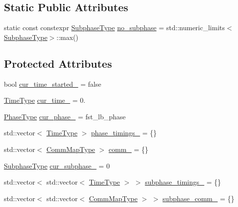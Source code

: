 \subsection*{Static Public Attributes}
\begin{DoxyCompactItemize}
\item 
static const constexpr \hyperlink{namespacevt_ae78cbfdf1e57470e33eedb074f2beeba}{Subphase\+Type} \hyperlink{structvt_1_1vrt_1_1collection_1_1balance_1_1_element_stats_a26682687c88b2c607365b040a9804096}{no\+\_\+subphase} = std\+::numeric\+\_\+limits$<$\hyperlink{namespacevt_ae78cbfdf1e57470e33eedb074f2beeba}{Subphase\+Type}$>$\+::max()
\end{DoxyCompactItemize}
\subsection*{Protected Attributes}
\begin{DoxyCompactItemize}
\item 
bool \hyperlink{structvt_1_1vrt_1_1collection_1_1balance_1_1_element_stats_a4fa029e81c6907ace700b8c3df10457f}{cur\+\_\+time\+\_\+started\+\_\+} = false
\item 
\hyperlink{namespacevt_a876a9d0cd5a952859c72de8a46881442}{Time\+Type} \hyperlink{structvt_1_1vrt_1_1collection_1_1balance_1_1_element_stats_ab0538c11d7a658e43f80c48023f7b8c6}{cur\+\_\+time\+\_\+} = 0.
\item 
\hyperlink{namespacevt_a46ce6733d5cdbd735d561b7b4029f6d7}{Phase\+Type} \hyperlink{structvt_1_1vrt_1_1collection_1_1balance_1_1_element_stats_a661531ffc78883018a8e553179f9324d}{cur\+\_\+phase\+\_\+} = fst\+\_\+lb\+\_\+phase
\item 
std\+::vector$<$ \hyperlink{namespacevt_a876a9d0cd5a952859c72de8a46881442}{Time\+Type} $>$ \hyperlink{structvt_1_1vrt_1_1collection_1_1balance_1_1_element_stats_ac3df7cd0b637aef1e0faa92bb0193542}{phase\+\_\+timings\+\_\+} = \{\}
\item 
std\+::vector$<$ \hyperlink{namespacevt_1_1vrt_1_1collection_1_1balance_a10860c956804d644db54a16012352728}{Comm\+Map\+Type} $>$ \hyperlink{structvt_1_1vrt_1_1collection_1_1balance_1_1_element_stats_a1673ce54a075060ea7e04c6e300b9682}{comm\+\_\+} = \{\}
\item 
\hyperlink{namespacevt_ae78cbfdf1e57470e33eedb074f2beeba}{Subphase\+Type} \hyperlink{structvt_1_1vrt_1_1collection_1_1balance_1_1_element_stats_a1a8a5e855950900f0f1b470ff5f6071b}{cur\+\_\+subphase\+\_\+} = 0
\item 
std\+::vector$<$ std\+::vector$<$ \hyperlink{namespacevt_a876a9d0cd5a952859c72de8a46881442}{Time\+Type} $>$ $>$ \hyperlink{structvt_1_1vrt_1_1collection_1_1balance_1_1_element_stats_a27ee2ef1979d4e4e9e4ca34fa8e88591}{subphase\+\_\+timings\+\_\+} = \{\}
\item 
std\+::vector$<$ std\+::vector$<$ \hyperlink{namespacevt_1_1vrt_1_1collection_1_1balance_a10860c956804d644db54a16012352728}{Comm\+Map\+Type} $>$ $>$ \hyperlink{structvt_1_1vrt_1_1collection_1_1balance_1_1_element_stats_a951e251e610ed8b3fedf56358bf689b1}{subphase\+\_\+comm\+\_\+} = \{\}
\end{DoxyCompactItemize}
